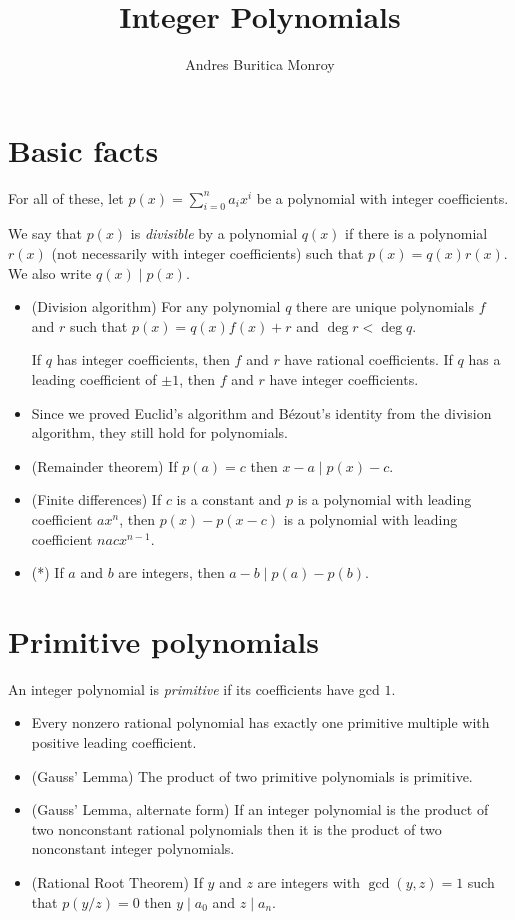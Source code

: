 \documentclass{article}
\title{Integer Polynomials}
\author{Andres Buritica Monroy}
\date{}
\begin{document}
\maketitle
\section{Basic facts}
For all of these, let $p(x)=\sum_{i=0}^n a_i x^i$ be a polynomial with integer
coefficients.

We say that $p(x)$ is \emph{divisible} by a polynomial $q(x)$ if there is a
polynomial $r(x)$ (not necessarily with integer coefficients) such that
$p(x)=q(x)r(x)$. We also write $q(x)\mid p(x)$.
\begin{itemize}
	\item (Division algorithm) For any polynomial $q$ there are unique
	      polynomials $f$ and $r$ such that $p(x)=q(x)f(x)+r$ and $\deg r<\deg q$.

	      If $q$ has integer coefficients, then $f$ and $r$ have rational
	      coefficients. If $q$ has a leading coefficient of $\pm 1$, then $f$ and $r$
	      have integer coefficients.
	\item Since we proved Euclid's algorithm and B\'ezout's identity from the
	      division algorithm, they still hold for polynomials.
	\item (Remainder theorem) If $p(a)=c$ then $x-a\mid p(x)-c$.
	\item (Finite differences) If $c$ is a constant and $p$ is a polynomial with
	      leading coefficient $ax^n$, then $p(x)-p(x-c)$ is a polynomial with
	      leading coefficient $nacx^{n-1}$.
	\item (*) If $a$ and $b$ are integers, then $a-b\mid p(a)-p(b)$.
\end{itemize}
\section{Primitive polynomials}
An integer polynomial is \emph{primitive} if its coefficients have gcd $1$.
\begin{itemize}
	\item Every nonzero rational polynomial has exactly one primitive multiple
	      with positive leading coefficient.
	\item (Gauss' Lemma) The product of two primitive polynomials is primitive.
	\item (Gauss' Lemma, alternate form) If an integer polynomial is the product
	      of two nonconstant rational polynomials then it is the product of two
	      nonconstant integer polynomials.
	\item (Rational Root Theorem) If $y$ and $z$ are integers with $\gcd(y,z)=1$
	      such that $p(y/z)=0$ then $y\mid a_0$ and $z\mid a_n$.
\end{itemize}
\end{document}
